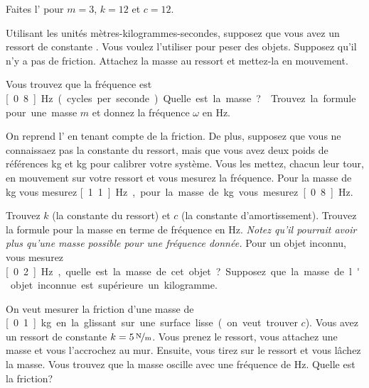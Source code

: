 \begin{exercise}
Faites l' pour $m=3$, $k=12$ et $c=12$.
\end{exercise}

\begin{exercise} \label{mv:exwt1}
	Utilisant les unités mètres-kilogrammes-secondes,
	supposez que vous avez un ressort de constante  .
	Vous voulez l'utiliser pour peser des objets. Supposez qu'il n'y a pas de friction. Attachez la masse au ressort et mettez-la en mouvement.  
	\begin{tasks}
		\task Vous trouvez que la fréquence est \unit[0.8]{Hz} (cycles per seconde).  Quelle est la masse?
		\task Trouvez la formule pour une masse  $m$ et donnez la fréquence $\omega$ en \unit{Hz}.
	\end{tasks}
\end{exercise}

\begin{exercise}
	On reprend l' en tenant compte de la friction.
	De plus, supposez que vous ne connaissaez pas la constante du ressort, mais que vous avez deux poids de références  \unit[1]{kg} et \unit[2]{kg} pour calibrer votre système.
	Vous les mettez, chacun leur tour, en mouvement sur votre ressort et vous mesurez la fréquence. Pour la masse de  \unit[1]{kg} vous mesurez \unit[1.1]{Hz}, pour la masse de  \unit[2]{kg} vous mesurez \unit[0.8]{Hz}.
	\begin{tasks}
		\task Trouvez $k$ (la constante du ressort) et $c$ (la constante d'amortissement).
		\task Trouvez la formule pour la masse en terme de fréquence en Hz.  
				\emph{Notez qu'il pourrait avoir plus qu'une masse possible pour une fréquence donnée.}
		\task Pour un objet inconnu, vous mesurez \unit[0.2]{Hz}, quelle est la masse de cet objet?   
				Supposez que la masse de l'objet inconnue est supérieure un kilogramme.
	\end{tasks}
\end{exercise}

\begin{exercise}
	On veut mesurer la friction d'une masse de  \unit[0.1]{kg} en la glissant sur une surface lisse (on veut trouver $c$).  Vous avez un ressort de constante  $k=\unitfrac[5]{N}{m}$.  Vous prenez le ressort, vous attachez une masse et vous l'accrochez au mur. Ensuite, vous tirez sur le ressort et vous lâchez la masse. Vous trouvez que la masse oscille avec une fréquence de  \unit[1]{Hz}.
	Quelle est la friction?
\end{exercise}


